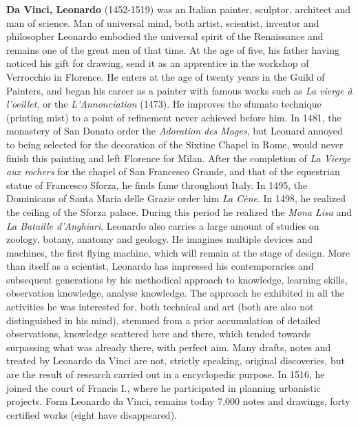 \textbf{Da Vinci, Leonardo} (1452-1519) was an Italian painter, sculptor, architect and man of science. Man of universal mind, both artist, scientist, inventor and philosopher Leonardo embodied the universal spirit of the Renaissance and remains one of the great men of that time. At the age of five, his father having noticed his gift for drawing, send it as an apprentice in the workshop of Verrocchio in Florence. He enters at the age of twenty years in the Guild of Painters, and began his career as a painter with famous works such as \textit{La vierge à l'oeillet}, or the \textit{L'Annonciation} (1473). He improves the sfumato technique (printing mist) to a point of refinement never achieved before him. In 1481, the monastery of San Donato order the \textit{Adoration des Mages}, but Leonard annoyed to being selected for the decoration of the Sixtine Chapel in Rome, would never finish this painting and left Florence for Milan. After the completion of \textit{La Vierge aux rochers} for the chapel of San Francesco Grande, and that of the equestrian statue of Francesco Sforza, he finds fame throughout Italy. In 1495, the Dominicans of Santa Maria delle Grazie order him \textit{La Cène}. In 1498, he realized the ceiling of the Sforza palace. During this period he realized the \textit{Mona Lisa} and \textit{La Bataille d'Anghiari}. Leonardo also carries a large amount of studies on zoology, botany, anatomy and geology. He imagines multiple devices and machines, the first flying machine, which will remain at the stage of design. More than itself as a scientist, Leonardo has impressed his contemporaries and subsequent generations by his methodical approach to knowledge, learning skills, observation knowledge, analyse knowledge. The approach he exhibited in all the activities he was interested for, both technical and art (both are also not distinguished in his mind), stemmed from a prior accumulation of detailed observations, knowledge scattered here and there, which tended towards surpassing what was already there, with perfect aim. Many drafts, notes and treated by Leonardo da Vinci are not, strictly speaking, original discoveries, but are the result of research carried out in a encyclopedic purpose. In 1516, he joined the court of Francis I., where he participated in planning urbanistic projects. Form Leonardo da Vinci, remains today 7,000 notes and drawings, forty certified works (eight have disappeared).

